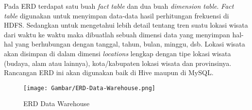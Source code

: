 Pada ERD terdapat satu buah \textit{fact table} dan dua buah \textit{dimension table}. \textit{Fact table} digunakan untuk menyimpan data-data hasil perhitungan frekuensi di HDFS. Sedangkan untuk mengetahui lebih detail tentang tren suatu lokasi wisata dari waktu ke waktu maka dibuatlah sebuah dimensi data yang menyimpan hal-hal yang berhubungan dengan tanggal, tahun, bulan, minggu, dsb. Lokasi wisata akan disimpan di dalam dimensi \textit{locations} lengkap dengan tipe lokasi wisata (budaya, alam atau lainnya), kota/kabupaten lokasi wisata dan provinsinya. Rancangan ERD ini akan digunakan baik di Hive maupun di MySQL.

\begin{figure}[H]
	\centering
	\texttt{[image: Gambar/ERD-Data-Warehouse.png]}
	\caption[ERD Data Warehouse]{ERD Data Warehouse} 
	\label{fig:erd_data_warehouse}
\end{figure}
